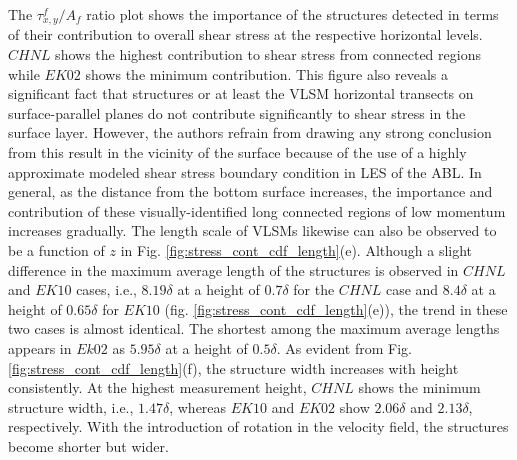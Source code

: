 The $\tau_{x,y}^f/A_f$ ratio plot shows the importance of the structures detected in terms of their contribution to overall shear stress at the respective horizontal levels.  $CHNL$  shows the highest  contribution to shear stress from  connected regions  while $EK02$ shows  the minimum contribution.  This figure also reveals a significant fact that structures or at least the VLSM horizontal transects on surface-parallel planes  do not contribute significantly to shear stress in the surface layer.  However, the authors refrain from drawing any strong conclusion from this result in the vicinity of the surface because of the use of a highly approximate modeled shear stress boundary condition in LES of the ABL.  In general, as the distance from the bottom surface increases, the importance and contribution of these visually-identified long connected regions of low momentum increases gradually. The length scale of VLSMs likewise can also be observed to be a function of $z$ in Fig. \ref{fig:stress_cont_cdf_length}(e). Although a slight difference in the maximum average  length of the structures is observed in $CHNL$ and $EK10$ cases, i.e., $8.19\delta$ at a height of $0.7\delta$ for the $CHNL$ case and $8.4\delta$ at a height of $0.65\delta$ for $EK10$ (fig. \ref{fig:stress_cont_cdf_length}(e)), the trend in these two cases is almost identical. The shortest among the maximum average lengths appears in $Ek02$  as $5.95\delta$ at a height of $0.5\delta$.  As evident from Fig. \ref{fig:stress_cont_cdf_length}(f), the structure width increases with height consistently.  At the highest measurement height, $CHNL$  shows the minimum structure width, i.e., $1.47\delta$, whereas $EK10$ and $EK02$  show $2.06\delta$ and $2.13\delta$, respectively. With the introduction of rotation in the velocity field, the structures become shorter but wider. 

